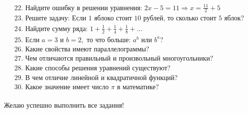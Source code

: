 \documentclass{article}
\begin{document}
\[\begin{align*}
&\text{22. Найдите ошибку в решении уравнения: } 2x - 5 = 11 \Rightarrow x = \frac{11}{2} + 5 \\
&\text{23. Решите задачу: Если 1 яблоко стоит 10 рублей, то сколько стоит 5 яблок?} \\
&\text{24. Найдите сумму ряда: } 1 + \frac{1}{2} + \frac{1}{4} + \frac{1}{8} + \ldots \\
&\text{25. Если } a = 3 \text{ и } b = 2, \text{ то что больше: } a^b \text{ или } b^a? \\
&\text{26. Какие свойства имеют параллелограммы?} \\
&\text{27. Чем отличаются правильный и произвольный многоугольники?} \\
&\text{28. Какие способы решения уравнений существуют?} \\
&\text{29. В чем отличие линейной и квадратичной функций?} \\
&\text{30. Какое значение имеет число } \pi \text{ в математике?} \\
\end{align*}
\]

Желаю успешно выполнить все задания!
\end{document}
